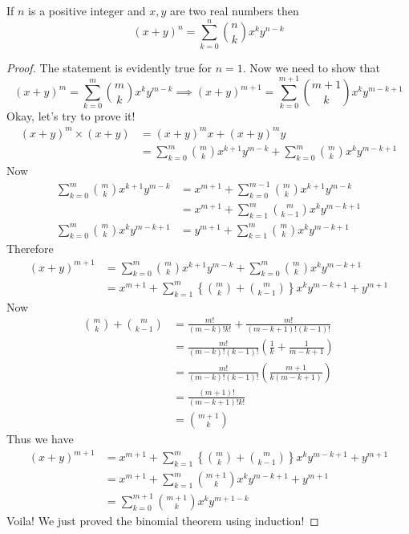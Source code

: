\documentclass[11pt,numbers=noenddot,svgnames,dvipsnames]{scrartcl}
\begin{document}
\begin{example}
    If $n$ is a positive integer and $x, y$ are two real numbers then 
    \[
        (x + y)^{n} = \sum_{k=0}^{n} \binom{n}{k} x^{k}y^{n-k}
    \]
\end{example}
\begin{proof}
    The statement is evidently true for $n=1$. Now we need to show that 
    \[
        (x + y)^{m} = \sum_{k=0}^{m} \binom{m}{k} x^{k} y^{m - k}
        \implies (x + y)^{m + 1} = \sum_{k=0}^{m + 1} \binom{m+1}{k} x^{k} y^{m - k + 1}
    \]
    Okay, let's try to prove it!
    \begin{align*}
        (x + y)^{m} \times (x + y) 
        &= (x + y)^{m} x + (x + y)^{m} y \\
        &= \sum_{k=0}^{m} \binom{m}{k} x^{k + 1} y^{m - k} + \sum_{k=0}^{m} \binom{m}{k} x^{k} y^{m - k + 1}
    \end{align*}
    Now 
    \begin{align*}
        \sum_{k=0}^{m} \binom{m}{k} x^{k + 1} y^{m - k} &= x^{m + 1} + 
        \sum_{k=0}^{m-1} \binom{m}{k} x^{k+1} y^{m - k} \\
        &= x^{m+1} + \sum_{k=1}^{m} \binom{m}{k-1} x^{k} y^{m - k + 1} \\ 
        \sum_{k=0}^{m} \binom{m}{k} x^{k} y^{m - k + 1} &= y^{m + 1} + 
        \sum_{k = 1}^{m} \binom{m}{k} x^{k} y^{m - k + 1}
    \end{align*}
    Therefore 
    \begin{align*}
        (x + y)^{m + 1} &= \sum_{k=0}^{m} \binom{m}{k} x^{k + 1} y^{m - k} + \sum_{k=0}^{m} \binom{m}{k} x^{k} y^{m - k + 1} \\
        &= x^{m + 1} + \sum_{k=1}^{m} \left\{\binom{m}{k} + \binom{m}{k-1} \right\} x^{k} y^{m - k + 1} + y^{m + 1}
    \end{align*}
    Now 
    \begin{align*}
        \binom{m}{k} + \binom{m}{k - 1} &= \frac{m!}{(m - k)!k!} + \frac{m!}{(m - k + 1)!(k - 1)!} \\
                                        &= \frac{m!}{(m - k)!(k - 1)!} \left(\frac{1}{k} + \frac{1}{m - k + 1}\right) \\
                                        &= \frac{m!}{(m - k)!(k - 1)!}\left(\frac{m + 1}{k(m - k + 1)}\right) \\
                                        &= \frac{(m + 1)!}{(m - k + 1)! k!} \\
                                        &= \binom{m + 1}{k}
    \end{align*}
    Thus we have 
    \begin{align*}
        (x + y)^{m + 1} 
        &= x^{m + 1} + \sum_{k=1}^{m} \left\{\binom{m}{k} + \binom{m}{k-1} \right\} x^{k} y^{m - k + 1} + y^{m + 1} \\
        &= x^{m + 1} + \sum_{k=1}^{m} \binom{m + 1}{k} x^{k} y^{m - k + 1} + y^{m + 1} \\
        &= \sum_{k = 0}^{m + 1} \binom{m + 1}{k} x^{k} y^{m + 1 - k}
    \end{align*}
    Voila! We just proved the binomial theorem using induction!
\end{proof}
\end{document}
